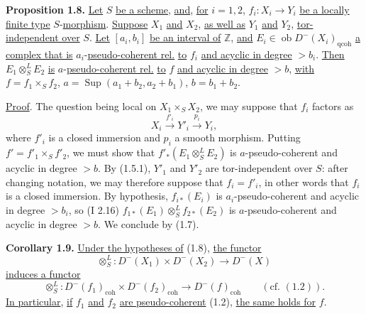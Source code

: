 \textbf{Proposition 1.8.} \uline{Let} \(S\) \uline{be a scheme}, \uline{and}, \uline{for} \(i=1,2\), \(f_i:X_i\longrightarrow Y_i\) \uline{be a locally finite type} \(S\)-\uline{morphism}. \uline{Suppose} \(X_1\) \uline{and} \(X_2\), \uline{as well as} \(Y_1\) \uline{and} \(Y_2\), \uline{tor-independent over} \(S\). \uline{Let} \([a_i,b_i]\) \uline{be an interval of} \(\mathbb Z\), \uline{and} \(E_i\in\operatorname{ob} D^{-}(X_i)_{\mathrm{qcoh}}\) \uline{a complex that is} \(a_i\)-\uline{pseudo-coherent rel.} \uline{to} \(f_i\) \uline{and acyclic in degree} \(>b_i\). \uline{Then} \(E_1\otimes_S^{L}E_2\) \uline{is} \(a\)-\uline{pseudo-coherent rel.} \uline{to} \(f\) \uline{and acyclic in degree} \(>b\), \uline{with} \(f=f_1\times_Sf_2\), \(a=\operatorname{Sup}(a_1+b_2,a_2+b_1)\), \(b=b_1+b_2\).

\uline{Proof}. The question being local on \(X_1\times_SX_2\), we may suppose that \(f_i\) factors as
\[
  X_i\xrightarrow{f'_i}Y'_i\xrightarrow{p_i}Y_i,
\]
where \(f'_i\) is a closed immersion and \(p_i\) a smooth morphism. Putting \(f'=f'_1\times_Sf'_2\), we must show that \(f'_*(E_1\otimes_S^{L}E_2)\) is \(a\)-pseudo-coherent and acyclic in degree \(>b\). By (1.5.1), \(Y'_1\) and \(Y'_2\) are tor-independent over \(S\): after changing notation, we may therefore suppose that \(f_i=f'_i\), in other words that \(f_i\) is a closed immersion. By hypothesis, \(f_{i*}(E_i)\) is \(a_i\)-pseudo-coherent and acyclic in degree \(>b_i\), so (I 2.16) \(f_{1*}(E_1)\otimes_S^{L}f_{2*}(E_2)\) is \(a\)-pseudo-coherent and acyclic in degree \(>b\). We conclude by (1.7).

\textbf{Corollary 1.9.} \uline{Under the hypotheses of} (1.8), \uline{the functor}
\[
  \otimes_S^{L}:D^{-}(X_1)\times D^{-}(X_2)\longrightarrow D^{-}(X)
\]
\uline{induces a functor}
\[
  \otimes_S^{L}:D^{-}(f_1)_{\mathrm{coh}}\times D^{-}(f_2)_{\mathrm{coh}}
  \longrightarrow D^{-}(f)_{\mathrm{coh}}\qquad(\text{cf. }(1.2)).
\]
\uline{In particular}, \uline{if} \(f_1\) \uline{and} \(f_2\) \uline{are pseudo-coherent} (1.2), \uline{the same holds for} \(f\).

